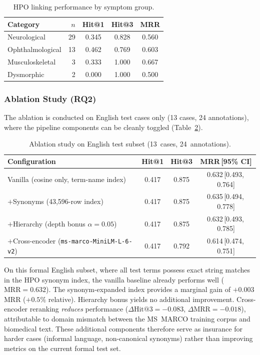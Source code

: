 \documentclass[11pt,a4paper]{article}
\begin{document}
\begin{table}[H]
\centering
\caption{HPO linking performance by symptom group.}
\label{tab:symptom}
\begin{tabular}{lrccc}
\toprule
\textbf{Category} & $n$ & \textbf{Hit@1} & \textbf{Hit@3} & \textbf{MRR} \\
\midrule
Neurological      & 29 & 0.345 & 0.828 & 0.560 \\
Ophthalmological  & 13 & 0.462 & 0.769 & 0.603 \\
Musculoskeletal   &  3 & 0.333 & 1.000 & 0.667 \\
Dysmorphic        &  2 & 0.000 & 1.000 & 0.500 \\
\bottomrule
\end{tabular}
\end{table}

\subsubsection*{Ablation Study (RQ2)}
\label{sec:rq2}

The ablation is conducted on English test cases only (13 cases, 24 annotations),
where the pipeline components can be cleanly toggled (Table~\ref{tab:ablation}).

\begin{table}[H]
\centering
\caption{Ablation study on English test subset (13~cases, 24~annotations).}
\label{tab:ablation}
\begin{tabular}{lccc}
\toprule
\textbf{Configuration} & \textbf{Hit@1} & \textbf{Hit@3}
                       & \textbf{MRR}\,{\scriptsize[95\% CI]} \\
\midrule
Vanilla (cosine only, term-name index)
  & 0.417 & 0.875 & 0.632\,{\scriptsize[0.493,\,0.764]} \\
$+$Synonyms (43{,}596-row index)
  & 0.417 & 0.875 & 0.635\,{\scriptsize[0.494,\,0.778]} \\
$+$Hierarchy (depth bonus $\alpha{=}0.05$)
  & 0.417 & 0.875 & 0.632\,{\scriptsize[0.493,\,0.785]} \\
$+$Cross-encoder (\texttt{ms-marco-MiniLM-L-6-v2})
  & 0.417 & 0.792 & 0.614\,{\scriptsize[0.474,\,0.751]} \\
\bottomrule
\end{tabular}
\end{table}

On this formal English subset, where all test terms possess exact string matches
in the HPO synonym index, the vanilla baseline already performs well
($\mathrm{MRR} = 0.632$).  The synonym-expanded index provides a marginal gain
of $+0.003$ MRR ($+0.5\%$ relative).  Hierarchy bonus yields no additional
improvement.  Cross-encoder reranking \emph{reduces} performance
($\Delta\text{Hit@3} = -0.083$, $\Delta\text{MRR} = -0.018$), attributable to
domain mismatch between the MS~MARCO training corpus and biomedical text.
These additional components therefore serve as insurance for harder cases
(informal language, non-canonical synonyms) rather than improving metrics on
the current formal test set.
\end{document}
